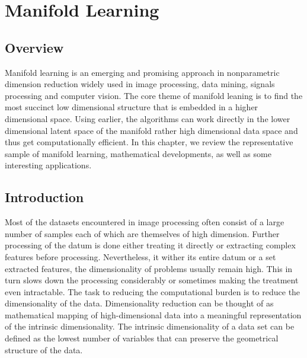 \chapter{Manifold Learning} %

\label{Chapter3} %


\section*{Overview}
Manifold learning is an emerging and promising approach in nonparametric dimension reduction widely used in image processing, data mining, signals processing and computer vision. The core theme of manifold leaning is to find the most succinct low dimensional structure that is embedded
in a higher dimensional space. Using earlier, the algorithms can work directly in the lower dimensional latent space of the manifold rather high dimensional data space and thus get computationally efficient. In this chapter, we review the representative sample of manifold learning, mathematical developments, as well as some interesting applications. 
\section{Introduction}
Most of the datasets encountered in image processing often consist of
a large number of samples each of which are themselves of high dimension.
Further processing of the datum is done either treating it directly or extracting complex features before processing. Nevertheless, it  wither its
entire datum or a set extracted features, the dimensionality of
problems usually remain high. This in turn slows down the processing considerably or sometimes making the treatment even intractable. The task to reducing the computational burden is to reduce the dimensionality of the data. Dimensionality reduction can be thought of as mathematical mapping of high-dimensional data into a meaningful representation of the intrinsic dimensionality. The intrinsic dimensionality of a data set can be defined as the lowest number of variables that can preserve the geometrical structure of the data.


